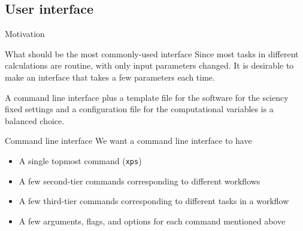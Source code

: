 \subsection{User interface}

\begin{frame}{Motivation}

    \begin{block}{What should be the most commonly-used interface}
        Since most tasks in different \ab{} calculations are routine, with only
        input parameters changed. It is desirable to make an interface that takes a few
        parameters each time.

        A command line interface plus a template file for the \ab{} software for the sciency
        fixed settings and a configuration file for the computational variables is a
        balanced choice.
    \end{block}

    \begin{block}{Command line interface}
        We want a command line interface to have

        \begin{itemize}
            \item A single topmost command (\texttt{xps})
            \item A few second-tier commands corresponding to different workflows
            \item A few third-tier commands corresponding to different tasks in a workflow
            \item A few arguments, flags, and options for each command mentioned above
        \end{itemize}
    \end{block}

\end{frame}

